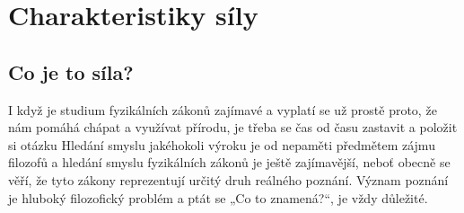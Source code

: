 \setchaptertoc
\chapter{Charakteristiky síly}\label{fyz:IchapXII}

  \section{Co je to síla?}\label{fyz:IchapXIIsecI}
    I když je studium fyzikálních zákonů zajímavé a vyplatí se už prostě proto, že nám pomáhá 
    chápat a využívat přírodu, je třeba se čas od času zastavit a položit si otázku  Hledání smyslu jakéhokoli výroku je od nepaměti předmětem zájmu 
    filozofů a hledání smyslu fyzikálních zákonů je ještě zajímavější, neboť obecně se věří, že 
    tyto zákony reprezentují určitý druh reálného poznání. Význam poznání je hluboký filozofický 
    problém a ptát se „Co to znamená?“, je vždy důležité.
    
